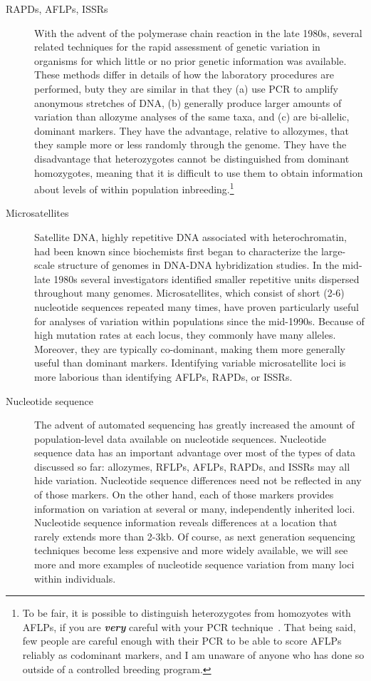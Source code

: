 \begin{description}
\item[RAPDs, AFLPs, ISSRs] With the advent of the polymerase chain
  reaction in the late 1980s, several related techniques for the rapid
  assessment of genetic variation in organisms for which little or no
  prior genetic information was available. These methods differ in
  details of how the laboratory procedures are performed, buty they
  are similar in that they (a) use PCR to amplify anonymous stretches
  of DNA, (b) generally produce larger amounts of variation than
  allozyme analyses of the same taxa, and (c) are bi-allelic, dominant
  markers. They have the advantage, relative to allozymes, that they
  sample more or less randomly through the genome. They have the
  disadvantage that heterozygotes cannot be distinguished from
  dominant homozygotes, meaning that it is difficult to use them to
  obtain information about levels of within population
  inbreeding.\footnote{To be fair, it is possible to distinguish
    heterozygotes from homozyotes with AFLPs, if you are {\it\bf
      very\/} careful with your PCR
    technique~\cite{Jansen-etal-2001}. That being said, few people are
    careful enough with their PCR to be able to score AFLPs reliably
    as codominant markers, and I am unaware of anyone who has done so
    outside of a controlled breeding program.}

\item[Microsatellites] Satellite DNA, highly repetitive DNA associated
  with heterochromatin, had been known since biochemists first began
  to characterize the large-scale structure of genomes in DNA-DNA
  hybridization studies. In the mid-late 1980s several investigators
  identified smaller repetitive units dispersed throughout many
  genomes. Microsatellites, which consist of short (2-6) nucleotide
  sequences repeated many times, have proven particularly useful for
  analyses of variation within populations since the
  mid-1990s. Because of high mutation rates at each locus, they
  commonly have many alleles. Moreover, they are typically
  co-dominant, making them more generally useful than dominant
  markers. Identifying variable microsatellite loci is more laborious
  than identifying AFLPs, RAPDs, or ISSRs.

\item[Nucleotide sequence] The advent of automated sequencing has
  greatly increased the amount of population-level data available on
  nucleotide sequences. Nucleotide sequence data has an important
  advantage over most of the types of data discussed so far:
  allozymes, RFLPs, AFLPs, RAPDs, and ISSRs may all hide
  variation. Nucleotide sequence differences need not be reflected in
  any of those markers. On the other hand, each of those markers
  provides information on variation at several or many, independently
  inherited loci. Nucleotide sequence information reveals differences
  at a location that rarely extends more than 2-3kb. Of course, as
  next generation sequencing techniques become less expensive and more
  widely available, we will see more and more examples of nucleotide
  sequence variation from many loci within individuals.


\end{description}

